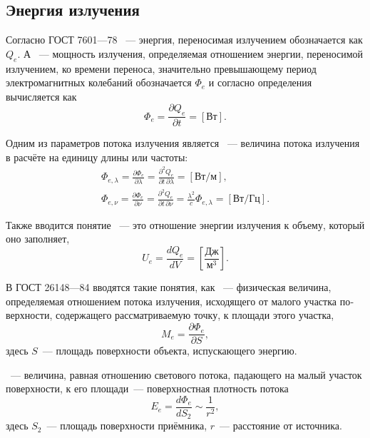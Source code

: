 \subsection{Энергия излучения}
Согласно ГОСТ 7601---78 ~--- энергия, переносимая излучением обозначается как $Q_e$. А ~--- мощность излучения, определяемая отношением энергии, переносимой излучением, ко времени переноса,  значительно превышающему период электромагнитных колебаний обозначается $\Phi_e$ и согласно определения вычисляется как
\begin{equation}
	\Phi_e = \frac{\partial Q_e}{\partial t} = [\text{Вт}].
\end{equation}

Одним из параметров потока излучения является ~--- величина потока излучения в расчёте на единицу длины или частоты:
\begin{gather*}
    \Phi_{e, \lambda}
    = \frac{\partial \Phi_e}{\partial \lambda} 
    = \frac{\partial^2 Q_e}{\partial t \, \partial \lambda}
    = [\text{Вт/м}],\\
    \Phi_{e, \nu} 
    = \frac{\partial \Phi_e}{\partial \nu} 
    = \frac{\partial^2 Q_e}{\partial t \, \partial \nu}
    = \frac{\lambda^2}{c}\Phi_{e, \lambda}
    = [\text{Вт/Гц}].
\end{gather*}

Также вводится понятие ~--- это отношение энергии излучения к объему, который оно заполняет,
\begin{equation}
	U_e = \frac{d Q_e}{dV} = \left[\frac{\text{Дж}}{\text{м}^3}\right].
\end{equation}

В ГОСТ 26148---84 вводятся такие понятия, как ~--- физическая величина, определяемая отношением потока излучения, исходящего от малого участка по­верхности, содержащего рассматри­ваемую точку, к площади этого участка,
\begin{equation}
	M_e = \frac{\partial \Phi_e}{\partial S},
\end{equation}
здесь $S$~--- площадь поверхности объекта, испускающего энергию.

~--- величина, равная отношению светового потока, падающего на малый участок поверхности, к его площади~--- поверхностная плотность потока
\begin{equation}
	E_e = \frac{d\Phi_e}{dS_2} \sim \frac{1}{r^2},
\end{equation}
здесь $S_2$~--- площадь поверхности приёмника, $r$~--- расстояние от источника.

